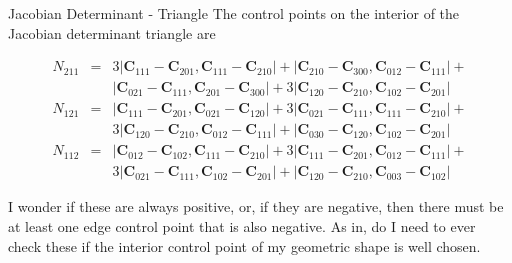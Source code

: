 \documentclass[12pt]{beamer}
\begin{document}
\begin{frame}{Jacobian Determinant - Triangle}
The control points on the interior of the Jacobian determinant triangle are
{
  \scriptsize

\begin{eqnarray*}
N_{211}&=&3\left|\mathbf{C}_{111}-\mathbf{C}_{201},\mathbf{C}_{111}-\mathbf{C}_{210}\right|+\left|\mathbf{C}_{210}-\mathbf{C}_{300},\mathbf{C}_{012}-\mathbf{C}_{111}\right|+\\&&\left|\mathbf{C}_{021}-\mathbf{C}_{111},\mathbf{C}_{201}-\mathbf{C}_{300}\right|+3\left|\mathbf{C}_{120}-\mathbf{C}_{210},\mathbf{C}_{102}-\mathbf{C}_{201}\right|
\\N_{121}&=&\left|\mathbf{C}_{111}-\mathbf{C}_{201},\mathbf{C}_{021}-\mathbf{C}_{120}\right|+3\left|\mathbf{C}_{021}-\mathbf{C}_{111},\mathbf{C}_{111}-\mathbf{C}_{210}\right|+\\&&3\left|\mathbf{C}_{120}-\mathbf{C}_{210},\mathbf{C}_{012}-\mathbf{C}_{111}\right|+\left|\mathbf{C}_{030}-\mathbf{C}_{120},\mathbf{C}_{102}-\mathbf{C}_{201}\right|
\\N_{112}&=&\left|\mathbf{C}_{012}-\mathbf{C}_{102},\mathbf{C}_{111}-\mathbf{C}_{210}\right|+3\left|\mathbf{C}_{111}-\mathbf{C}_{201},\mathbf{C}_{012}-\mathbf{C}_{111}\right|+\\&&3\left|\mathbf{C}_{021}-\mathbf{C}_{111},\mathbf{C}_{102}-\mathbf{C}_{201}\right|+\left|\mathbf{C}_{120}-\mathbf{C}_{210},\mathbf{C}_{003}-\mathbf{C}_{102}\right|
\end{eqnarray*}
}
I wonder if these are always positive, or, if they are negative, then there must be at least one edge control point that is also negative. As in, do I need to ever check these if the interior control point of my geometric shape is well chosen.
\end{frame}
\end{document}
